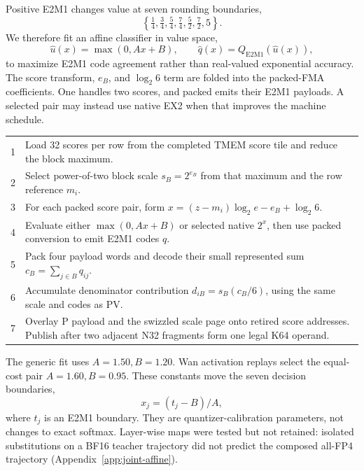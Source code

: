 Positive E2M1 changes value at seven rounding boundaries,
\begin{equation}
  \left\{\tfrac14,\tfrac34,\tfrac54,\tfrac74,
  \tfrac52,\tfrac72,5\right\}.
  \label{eq:e2m1-boundaries}
\end{equation}
We therefore fit an affine classifier in value space,
\begin{equation}
  \widehat u(x)=\max(0,Ax+B),\qquad
  \widehat q(x)=Q_{\mathrm{E2M1}}(\widehat u(x)),
  \label{eq:affine-code-map}
\end{equation}
to maximize E2M1 code agreement rather than real-valued exponential
accuracy. The score transform, $e_B$, and $\log_2 6$ term are folded into the
packed-FMA coefficients. One  handles two scores, and packed
 emits their E2M1 payloads. A selected pair may instead use native
EX2 when that improves the machine schedule.

\begin{algorithm}[H]
\caption{Direct MXFP4 probability production for one N32 score fragment}
\label{alg:direct-p-pack}
\small
\begin{tabularx}{\textwidth}{@{}rX@{}}
\toprule
1 & Load 32 scores per row from the completed TMEM score tile and reduce the block maximum. \\
2 & Select power-of-two block scale $s_B=2^{e_B}$ from that maximum and the row reference $m_i$. \\
3 & For each packed score pair, form $x=(z-m_i)\log_2 e-e_B+\log_2 6$. \\
4 & Evaluate either $\max(0,Ax+B)$ or selected native $2^x$, then use packed conversion to emit E2M1 codes $q$. \\
5 & Pack four payload words and decode their small represented sum $c_B=\sum_{j\in B}q_{ij}$. \\
6 & Accumulate denominator contribution $d_{iB}=s_B(c_B/6)$, using the same scale and codes as PV. \\
7 & Overlay P payload and the swizzled scale page onto retired score addresses. Publish after two adjacent N32 fragments form one legal K64 operand. \\
\bottomrule
\end{tabularx}
\end{algorithm}

The generic  fit uses $A=1.50,B=1.20$. Wan activation replays
select the equal-cost pair $A=1.60,B=0.95$. These constants move the seven
decision boundaries,
\begin{equation}
  x_j=(t_j-B)/A,
  \label{eq:affine-log-boundaries}
\end{equation}
where $t_j$ is an E2M1 boundary. They are quantizer-calibration parameters,
not changes to exact softmax. Layer-wise maps were tested but not retained:
isolated substitutions on a BF16 teacher trajectory did not predict the
composed all-FP4 trajectory (Appendix~\ref{app:joint-affine}).

